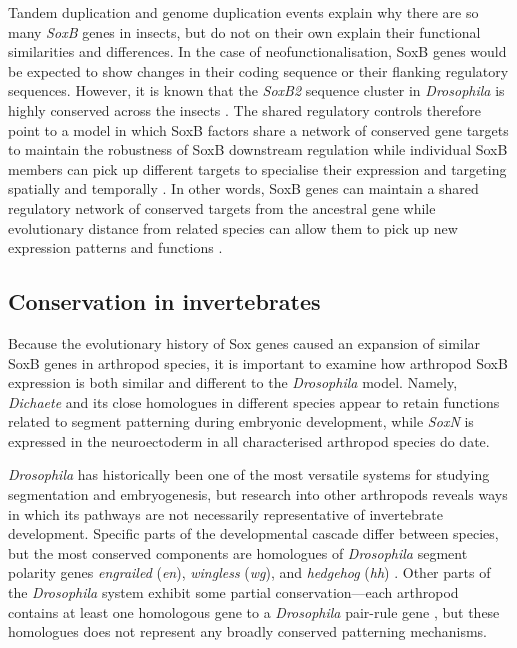 \documentclass[withindex,glossary]{cam-thesis}
\begin{document}
Tandem duplication and genome duplication events explain why there are
so many \emph{SoxB} genes in insects, but do not on their own explain
their functional similarities and differences. In the case of
neofunctionalisation, SoxB genes would be expected to show changes in
their coding sequence or their flanking regulatory sequences. However,
it is known that the \emph{SoxB2} sequence cluster in \emph{Drosophila}
is highly conserved across the insects . The
shared regulatory controls therefore point to a model in which SoxB
factors share a network of conserved gene targets to maintain the
robustness of SoxB downstream regulation while individual SoxB members
can pick up different targets to specialise their expression and
targeting spatially and temporally . In other words, SoxB genes can maintain a shared
regulatory network of conserved targets from the ancestral gene  while
evolutionary distance from related species can allow them to pick up new
expression patterns and functions .

\subsection{Conservation in invertebrates}

Because the evolutionary history of Sox genes caused an expansion of
similar SoxB genes in arthropod species, it is important to examine how
arthropod SoxB expression is both similar and different to the
\emph{Drosophila} model. Namely, \emph{Dichaete} and its close
homologues in different species appear to retain functions related to
segment patterning during embryonic development, while \emph{SoxN} is
expressed in the neuroectoderm in all characterised arthropod species do
date.

\emph{Drosophila} has historically been one of the most versatile
systems for studying segmentation and embryogenesis, but research into
other arthropods reveals ways in which its pathways are not necessarily
representative of invertebrate development. Specific parts of the
developmental cascade differ between species, but the most conserved
components are homologues of \emph{Drosophila} segment polarity genes
\emph{engrailed} (\emph{en}), \emph{wingless} (\emph{wg}), and
\emph{hedgehog} (\emph{hh}) . Other parts of the
\emph{Drosophila} system exhibit some partial conservation---each
arthropod contains at least one homologous gene to a \emph{Drosophila}
pair-rule gene , but these homologues does not
represent any broadly conserved patterning mechanisms.
\end{document}
